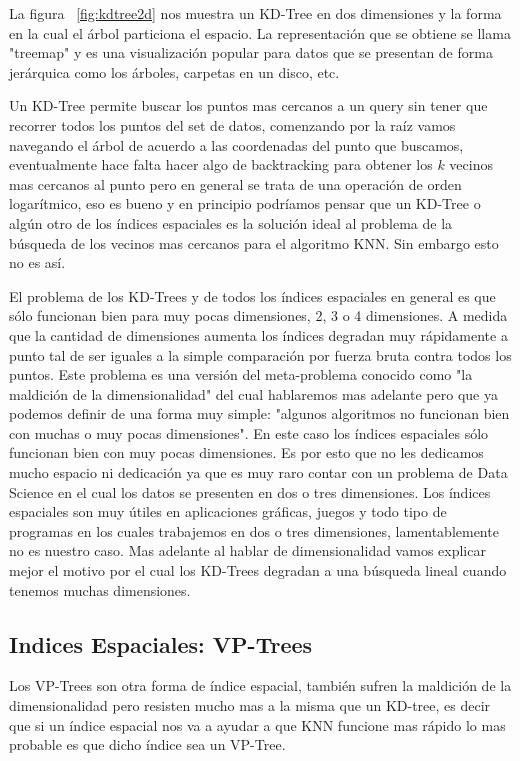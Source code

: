 La figura ~\ref{fig:kdtree2d} nos muestra un KD-Tree en dos dimensiones y la forma en la cual el árbol particiona el espacio. La representación que se obtiene se llama "treemap" y es una visualización popular para datos que se presentan de forma jerárquica como los árboles, carpetas en un disco, etc.

Un KD-Tree permite buscar los puntos mas cercanos a un query sin tener que recorrer todos los puntos del set de datos, comenzando por la raíz vamos navegando el árbol de acuerdo a las coordenadas del punto que buscamos, eventualmente hace falta hacer algo de backtracking para obtener los $k$ vecinos mas cercanos al punto pero en general se trata de una operación de orden logarítmico, eso es bueno y en principio podríamos pensar que un KD-Tree o algún otro de los índices espaciales es la solución ideal al problema de la búsqueda de los vecinos mas cercanos para el algoritmo KNN. Sin embargo esto no es así.

El problema de los KD-Trees y de todos los índices espaciales en general es que sólo funcionan bien para muy pocas dimensiones, 2, 3 o 4 dimensiones. A medida que la cantidad de dimensiones aumenta los índices degradan muy rápidamente a punto tal de ser iguales a la simple comparación por fuerza bruta contra todos los puntos. Este problema es una versión del meta-problema conocido como "la maldición de la dimensionalidad" del cual hablaremos mas adelante pero que ya podemos definir de una forma muy simple: "algunos algoritmos no funcionan bien con muchas o muy pocas dimensiones". En este caso los índices espaciales sólo funcionan bien con muy pocas dimensiones. Es por esto que no les dedicamos mucho espacio ni dedicación ya que es muy raro contar con un problema de Data Science en el cual los datos se presenten en dos o tres dimensiones. Los índices espaciales son muy útiles en aplicaciones gráficas, juegos y todo tipo de programas en los cuales trabajemos en dos o tres dimensiones, lamentablemente no es nuestro caso. Mas adelante al hablar de dimensionalidad vamos explicar mejor el motivo por el cual los KD-Trees degradan a una búsqueda lineal cuando tenemos muchas dimensiones.

\subsection{Indices Espaciales: VP-Trees}

Los VP-Trees son otra forma de índice espacial, también sufren la maldición de la dimensionalidad pero resisten mucho mas a la misma que un KD-tree, es decir que si un índice espacial nos va a ayudar a que KNN funcione mas rápido lo mas probable es que dicho índice sea un VP-Tree.


